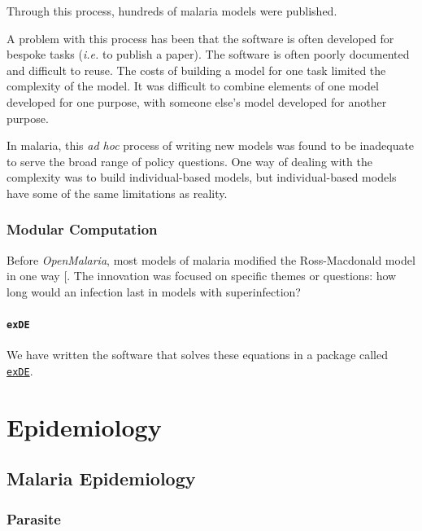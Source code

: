\documentclass[
]{book}
\begin{document}
Through this process, hundreds of malaria models were published.

A problem with this process has been that the software is often developed for bespoke tasks (\emph{i.e.} to publish a paper). The software is often poorly documented and difficult to reuse. The costs of building a model for one task limited the complexity of the model. It was difficult to combine elements of one model developed for one purpose, with someone else's model developed for another purpose.

In malaria, this \emph{ad hoc} process of writing new models was found to be inadequate to serve the broad range of policy questions. One way of dealing with the complexity was to build individual-based models, but individual-based models have some of the same limitations as reality.

\section{Modular Computation}\label{modular-computation}

Before \emph{OpenMalaria}, most models of malaria modified the Ross-Macdonald model in one way {[}\citeproc{ref-ReinerRC2013SystematicReview}{3}{]}. The innovation was focused on specific themes or questions: how long would an infection last in models with superinfection?

\subsection{\texorpdfstring{\texttt{exDE}}{exDE}}\label{exde}

We have written the software that solves these equations in a package called \href{https://cran.r-project.org/web/packages/exDE/index.html}{\texttt{exDE}}.

\part{Epidemiology}\label{part-epidemiology}

\chapter{Malaria Epidemiology}\label{malaria-epidemiology-1}

\section{Parasite}\label{parasite}
\end{document}
